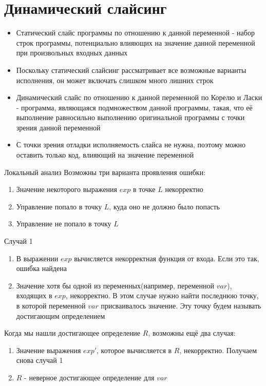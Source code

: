 \documentclass[presentation]{beamer}
\begin{document}
\section{Динамический слайсинг}
\label{sec:org95f06cf}
\begin{itemize}
\item \alert{Статический слайс программы по отношению к данной переменной} - набор строк программы, потенциально влияющих на значение данной переменной при произвольных входных данных
\item Поскольку статический слайсинг рассматривает все возможные варианты исполнения, он может включать слишком много лишних строк
\item \alert{Динамический слайс} по отношению к данной переменной по Корелю и Ласки - программа, являющаяся подмножеством данной программы, такая, что её выполнение равносильно выполнению оригинальной программы с точки зрения данной переменной
\item С точки зрения отладки исполняемость слайса не нужна, поэтому можно оставить только код, влияющий на значение переменной
\end{itemize}
\begin{frame}[label={sec:orgdd84b00}]{Локальный анализ}
Возможны три варианта проявления ошибки:
\begin{enumerate}
\item Значение некоторого выражения \(exp\) в точке \(L\) некорректно
\item Управление попало в точку \(L\), куда оно не должно было попасть
\item Управление не попало в точку \(L\)
\end{enumerate}
\end{frame}
\begin{frame}[label={sec:orgd98de93}]{Случай 1}
\begin{enumerate}
\item В выражении \(exp\) вычисляется некорректная функция от входа. Если это так, ошибка найдена
\item Значение хотя бы одной из переменных(например, переменной \(var\)), входящих в \(exp\), некорректно. В этом случае нужно найти последнюю точку, в которой переменной \(var\) присваивалось значение. Эту точку будем называть достигающим определением
\end{enumerate}
Когда мы нашли достигающее определение \(R\), возможны ещё два случая:
\begin{enumerate}
\item Значение выражения \(exp'\), которое вычисляется в \(R\), некорректно. Получаем снова случай 1
\item \(R\) - неверное достигающее определение для \(var\)
\end{enumerate}
\end{frame}
\end{document}
